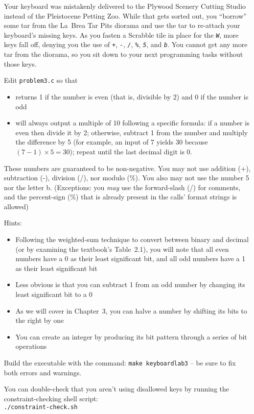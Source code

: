 Your keyboard was mistakenly delivered to the Plywood Scenery Cutting Studio instead of the Pleistocene Petting Zoo.
While that gets sorted out, you ``borrow'' some tar from the La~Brea Tar Pits diorama and use the tar to re-attach your keyboard's missing keys.
As you fasten a Scrabble tile in place for the \textit{\texttt{W}}, more keys fall off, denying you the use of \textit{\texttt{+}}, \textit{\texttt{-}}, \textit{\texttt{/}}, \textit{\texttt{\%}}, \textit{\texttt{5}}, and \textit{\texttt{b}}.
You cannot get any more tar from the diorama, so you sit down to your next programming tasks without those keys.

Edit \texttt{problem3.c} so that
\begin{itemize}
    \item {} returns 1 if the number is even (that is, divisible by 2) and 0 if the number is odd
    \item {} will always output a multiple of 10 following a specific formula: if a number is even then divide it by 2;
    otherwise, subtract 1 from the number and multiply the difference by 5 (for example, an input of 7 yields 30 because $(7-1) \times 5 = 30$);
    repeat until the last decimal digit is 0.
\end{itemize}
These numbers are guaranteed to be non-negative.
You may not use addition (+), subtraction (-), division (/), nor modulo (\%).
You also may not use the number 5 nor the letter b.
(Exceptions: you \textit{may} use the forward-slash (/) for comments, and the percent-sign (\%) that is already present in the  calls' format strings is allowed)

Hints:
\begin{itemize}
    \item Following the weighted-sum technique to convert between binary and decimal (or by examining the textbook's Table~2.1), you will note that all even numbers have a 0 as their least significant bit, and all odd numbers have a 1 as their least significant bit
    \item Less obvious is that you can subtract 1 from an odd number by changing its least significant bit to a 0
    \item As we will cover in Chapter~3, you can halve a number by shifting its bits to the right by one
    \item You can create an integer by producing its bit pattern through a series of bit operations
\end{itemize}

Build the executable with the command: \texttt{make keyboardlab3} -- be sure to fix both errors and warnings.

You can double-check that you aren't using disallowed keys by running the constraint-checking shell script: \\
\texttt{./constraint-check.sh} \\
